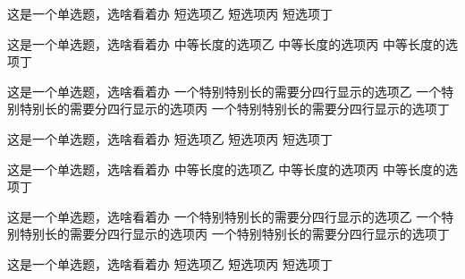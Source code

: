 \documentclass[answer,sheet]{cuzexam} %
\begin{document}
\begin{problem}
    这是一个单选题，选啥看着办
    {短选项乙}
    {短选项丙}
    {短选项丁}
\end{problem}

\begin{problem}
    这是一个单选题，选啥看着办
    {中等长度的选项乙}
    {中等长度的选项丙}
    {中等长度的选项丁}
\end{problem}

\begin{problem}
    这是一个单选题，选啥看着办
    {一个特别特别长的需要分四行显示的选项乙}
    {一个特别特别长的需要分四行显示的选项丙}
    {一个特别特别长的需要分四行显示的选项丁}
\end{problem}

\begin{problem}
    这是一个单选题，选啥看着办
    {短选项乙}
    {短选项丙}
    {短选项丁}
\end{problem}

\begin{problem}
    这是一个单选题，选啥看着办
    {中等长度的选项乙}
    {中等长度的选项丙}
    {中等长度的选项丁}
\end{problem}

\begin{problem}
    这是一个单选题，选啥看着办
    {一个特别特别长的需要分四行显示的选项乙}
    {一个特别特别长的需要分四行显示的选项丙}
    {一个特别特别长的需要分四行显示的选项丁}
\end{problem}

\begin{problem}
    这是一个单选题，选啥看着办
    {短选项乙}
    {短选项丙}
    {短选项丁}
\end{problem}

\begin{sheetcontents}
\end{sheetcontents}

\end{document}
